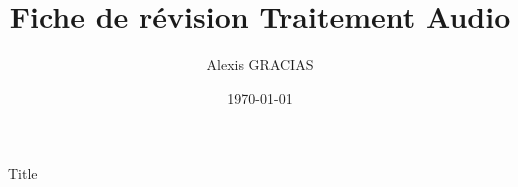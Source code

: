 \documentclass[14pt,french,aspectratio=169]{beamer}
\title{\Huge Fiche de révision Traitement Audio}
\author{\LARGE Alexis GRACIAS}
\date{\Large \today}
\begin{document}
\maketitle
\large \tableofcontents

\normalsize


\begin{frame}{Title}

\end{frame}
\end{document}
